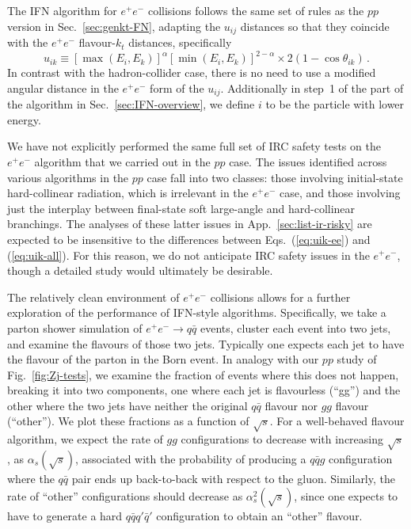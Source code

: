\documentclass[nofootinbib,twocolumn,preprintnumbers,superscriptaddress,aps]{revtex4-2}
\newcommand{\as}{\alpha_s}
\begin{document}
The IFN algorithm for $e^+e^-$ collisions follows the same set of
rules as the $pp$ version in Sec.~\ref{sec:genkt-FN}, adapting
the $u_{ij}$ distances so that they coincide with the $e^+e^-$
flavour-$k_t$ distances, specifically
\begin{equation}
  \label{eq:uik-ee}
  u_{ik} \equiv
  [\max\left(E_{i}, E_{k}\right)]^{\alpha}
  [\min\left(E_{i}, E_{k}\right)]^{2-\alpha}
  \times
  2(1-\cos\theta_{ik})\,.
\end{equation}
In contrast with the hadron-collider case, there is no need to use a
modified angular distance in the $e^+e^-$ form of the $u_{ij}$.
%
Additionally in step~1 of the part of the algorithm in
Sec.~\ref{sec:IFN-overview}, we define $i$ to be
the particle with lower energy.

We have not explicitly performed the same full set of IRC safety tests on the $e^+ e^-$ algorithm that
we carried out in the $pp$ case.
%
The issues identified across various algorithms in the $pp$ case fall
into two classes: those involving initial-state hard-collinear
radiation, which is irrelevant in the $e^+e^-$ case, and those
involving just the interplay between final-state soft large-angle and
hard-collinear branchings.
%
The analyses of these latter issues in App.~\ref{sec:list-ir-risky}
are expected to be insensitive to the differences between
Eqs.~(\ref{eq:uik-ee}) and (\ref{eq:uik-all}).
%
For this reason, we do not anticipate IRC safety issues in the
$e^+ e^-$, though a detailed study would ultimately be desirable.


The relatively clean environment of $e^+e^-$ collisions allows for a
further exploration of the performance of IFN-style algorithms.
%
Specifically, we take a parton shower simulation of
$e^+e^- \to q\bar q$ events, cluster each event into two jets, and examine the
flavours of those two jets.
%
Typically one expects each jet to have the flavour of the parton in
the Born event.
%
In analogy with our $pp$ study of Fig.~\ref{fig:Zj-tests}, we
examine the fraction of events where this does not happen, breaking it
into two components, one where each jet is flavourless (``gg'') and
the other where the two jets have neither the original 
$q\bar q$ flavour nor $gg$ flavour (``other'').
%
We plot these fractions as a function of $\sqrt{s}$.
%
For a well-behaved flavour algorithm, we expect the rate of $gg$
configurations to decrease with increasing $\sqrt{s}$, as
$\as(\sqrt{s})$, associated with the probability of producing a
$q\bar q g$ configuration where the $q\bar q$ pair ends up
back-to-back with respect to the gluon.
%
Similarly, the rate of ``other'' configurations should decrease as
$\as^2(\sqrt{s})$, since one expects to have to generate a hard
$q\bar q q'\bar q'$ configuration to obtain an ``other'' flavour.
\end{document}
